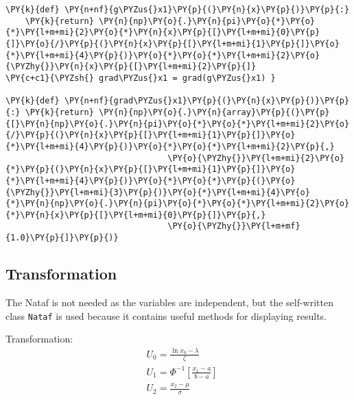     \begin{tcolorbox}[breakable, size=fbox, boxrule=1pt, pad at break*=1mm,colback=cellbackground, colframe=cellborder]
\begin{Verbatim}[commandchars=\\\{\}]
\PY{k}{def} \PY{n+nf}{g\PYZus{}x1}\PY{p}{(}\PY{n}{x}\PY{p}{)}\PY{p}{:}
    \PY{k}{return} \PY{n}{np}\PY{o}{.}\PY{n}{pi}\PY{o}{*}\PY{o}{*}\PY{l+m+mi}{2}\PY{o}{*}\PY{n}{x}\PY{p}{[}\PY{l+m+mi}{0}\PY{p}{]}\PY{o}{/}\PY{p}{(}\PY{n}{x}\PY{p}{[}\PY{l+m+mi}{1}\PY{p}{]}\PY{o}{*}\PY{l+m+mi}{4}\PY{p}{)}\PY{o}{*}\PY{o}{*}\PY{l+m+mi}{2}\PY{o}{\PYZhy{}}\PY{n}{x}\PY{p}{[}\PY{l+m+mi}{2}\PY{p}{]}
\PY{c+c1}{\PYZsh{} grad\PYZus{}x1 = grad(g\PYZus{}x1) }

\PY{k}{def} \PY{n+nf}{grad\PYZus{}x1}\PY{p}{(}\PY{n}{x}\PY{p}{)}\PY{p}{:} \PY{k}{return} \PY{n}{np}\PY{o}{.}\PY{n}{array}\PY{p}{(}\PY{p}{[}\PY{n}{np}\PY{o}{.}\PY{n}{pi}\PY{o}{*}\PY{o}{*}\PY{l+m+mi}{2}\PY{o}{/}\PY{p}{(}\PY{n}{x}\PY{p}{[}\PY{l+m+mi}{1}\PY{p}{]}\PY{o}{*}\PY{l+m+mi}{4}\PY{p}{)}\PY{o}{*}\PY{o}{*}\PY{l+m+mi}{2}\PY{p}{,}
                                 \PY{o}{\PYZhy{}}\PY{l+m+mi}{2}\PY{o}{*}\PY{p}{(}\PY{n}{x}\PY{p}{[}\PY{l+m+mi}{1}\PY{p}{]}\PY{o}{*}\PY{l+m+mi}{4}\PY{p}{)}\PY{o}{*}\PY{o}{*}\PY{p}{(}\PY{o}{\PYZhy{}}\PY{l+m+mi}{3}\PY{p}{)}\PY{o}{*}\PY{l+m+mi}{4}\PY{o}{*}\PY{n}{np}\PY{o}{.}\PY{n}{pi}\PY{o}{*}\PY{o}{*}\PY{l+m+mi}{2}\PY{o}{*}\PY{n}{x}\PY{p}{[}\PY{l+m+mi}{0}\PY{p}{]}\PY{p}{,}
                                 \PY{o}{\PYZhy{}}\PY{l+m+mf}{1.0}\PY{p}{]}\PY{p}{)}
\end{Verbatim}
\end{tcolorbox}

    \hypertarget{transformation}{%
\subsection{Transformation}\label{transformation}}

The Nataf is not needed as the variables are independent, but the
self-written class \texttt{Nataf} is used because it contains useful
methods for displaying results.

Transformation: \[\begin{aligned}
&U_{0}=\frac{\ln x_{0}-\lambda}{\zeta}\\
&U_{1}=\Phi^{-1}\left[\frac{x_{1}-a}{b-a}\right]\\
&U_{2}=\frac{x_{2}-\mu}{\sigma}
\end{aligned}\]

